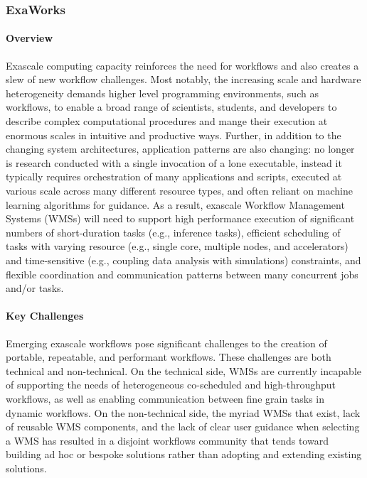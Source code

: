 
\subsubsection{ ExaWorks} \label{subsubsect:exaworks}


\paragraph{Overview} Exascale computing capacity reinforces the need for workflows and also creates
a slew of new workflow challenges. Most notably, the increasing scale and
hardware heterogeneity demands higher level programming environments, such as
workflows, to enable a broad range of scientists, students, and developers to
describe complex computational procedures and mange their execution at
enormous scales in intuitive and productive ways. Further, in addition to the
changing system architectures, application patterns are also changing: no
longer is research conducted with a single invocation of a lone executable,
instead it typically requires orchestration of many applications and scripts,
executed at various scale across many different resource types, and often
reliant on machine learning algorithms for guidance. As a result, exascale
Workflow Management Systems (WMSs) will need to support high performance
execution of significant numbers of short-duration tasks (e.g., inference
tasks), efficient scheduling of tasks with varying resource (e.g., single
core, multiple nodes, and accelerators) and time-sensitive (e.g., coupling
data analysis with simulations) constraints, and flexible coordination and
communication patterns between many concurrent jobs and/or tasks.


\paragraph{Key Challenges}
Emerging exascale workflows pose significant challenges to the creation of
portable, repeatable, and performant workflows. These challenges are both
technical and non-technical. On the technical side, WMSs are currently
incapable of supporting the needs of heterogeneous co-scheduled and
high-throughput workflows, as well as enabling communication between fine
grain tasks in dynamic workflows. On the non-technical side, the myriad WMSs
that exist, lack of reusable WMS components, and the lack of clear user
guidance when selecting a WMS has resulted in a disjoint workflows community
that tends toward building ad hoc or bespoke solutions rather than adopting
and extending existing solutions.

